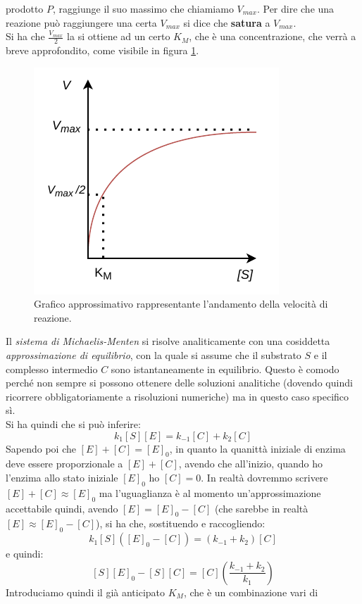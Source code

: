 \documentclass[a4paper,12pt, oneside]{book}
\begin{document}
prodotto $P$, raggiunge il suo massimo che chiamiamo
$V_{max}$. Per dire che una reazione può raggiungere una certa $V_{max}$ si
dice che \textbf{satura} a $V_{max}$. \\
Si ha che $\frac{V_{max}}{2}$ la si ottiene ad un certo $K_M$, che è una
concentrazione, che verrà a breve approfondito, come visibile in figura
\ref{fig:km}.\\
\begin{figure}
  \centering
  \includegraphics[scale = 1]{img/graph.pdf}
  \caption{Grafico approssimativo rappresentante l'andamento della velocità di
    reazione.} 
  \label{fig:km}
\end{figure}
Il \textit{sistema di Michaelis-Menten} si risolve analiticamente con una
cosiddetta \textit{approssimazione di equilibrio}, con la quale si assume che il
substrato $S$ e il complesso intermedio $C$ sono istantaneamente in
equilibrio. Questo è comodo perché non sempre si possono ottenere delle
soluzioni analitiche (dovendo quindi ricorrere obbligatoriamente a risoluzioni
numeriche) ma in questo caso specifico sì. \\ 
Si ha quindi che si può inferire:
\[k_1[S][E]=k_{-1}[C]+k_2[C]\]
Sapendo poi che $[E]+[C]=[E]_0$, in quanto la quanittà iniziale di enzima deve
essere proporzionale a $[E]+[C]$, avendo che all'inizio, quando ho l'enzima allo
stato iniziale $[E]_0$ ho $[C]=0$. In realtà dovremmo scrivere $[E]+[C]\approx
[E]_0$ ma l'uguaglianza è al momento un'approssimazione accettabile
quindi, avendo $[E] = [E]_0-[C]$ (che sarebbe in realtà $[E] \approx
[E]_0-[C]$), si ha che, sostituendo e raccogliendo:  
\[k_1[S]([E]_0-[C])=(k_{-1}+k_2)[C]\]
e quindi:
\[[S][E]_0-[S][C]=[C]\left(\frac{k_{-1}+k_2}{k_1}\right)\]
Introduciamo quindi il già anticipato $K_M$, che è un combinazione vari di
\end{document}
